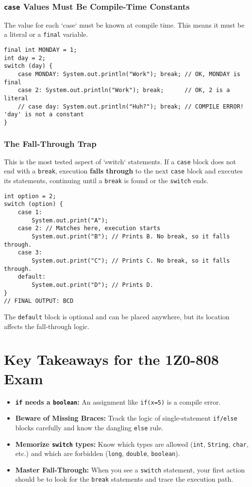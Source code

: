 \documentclass[12pt]{article}
\begin{document}
\begin{enumerate}[label=(\arabic*)]
\subsubsection*{\texttt{case} Values Must Be Compile-Time Constants}
The value for each `case` must be known at compile time. This means it must be a literal or a \texttt{final} variable.
\begin{verbatim}
final int MONDAY = 1;
int day = 2;
switch (day) {
    case MONDAY: System.out.println("Work"); break; // OK, MONDAY is final
    case 2: System.out.println("Work"); break;      // OK, 2 is a literal
    // case day: System.out.println("Huh?"); break; // COMPILE ERROR! 'day' is not a constant
}
\end{verbatim}

\subsubsection*{The Fall-Through Trap}
This is the most tested aspect of `switch` statements. If a \texttt{case} block does not end with a \texttt{break}, execution \textbf{falls through} to the next \texttt{case} block and executes its statements, continuing until a \texttt{break} is found or the \texttt{switch} ends.
\begin{verbatim}
int option = 2;
switch (option) {
    case 1: 
        System.out.print("A");
    case 2: // Matches here, execution starts
        System.out.print("B"); // Prints B. No break, so it falls through.
    case 3: 
        System.out.print("C"); // Prints C. No break, so it falls through.
    default:
        System.out.print("D"); // Prints D.
}
// FINAL OUTPUT: BCD
\end{verbatim}
The \texttt{default} block is optional and can be placed anywhere, but its location affects the fall-through logic.

\section*{Key Takeaways for the 1Z0-808 Exam}
\begin{itemize}
    \item \textbf{\texttt{if} needs a \texttt{boolean}:} An assignment like \texttt{if(x=5)} is a compile error.
    \item \textbf{Beware of Missing Braces:} Track the logic of single-statement \texttt{if/else} blocks carefully and know the dangling \texttt{else} rule.
    \item \textbf{Memorize \texttt{switch} types:} Know which types are allowed (\texttt{int}, \texttt{String}, \texttt{char}, etc.) and which are forbidden (\texttt{long}, \texttt{double}, \texttt{boolean}).
    \item \textbf{Master Fall-Through:} When you see a \texttt{switch} statement, your first action should be to look for the \texttt{break} statements and trace the execution path.
\end{itemize}
\end{enumerate}
\end{document}
